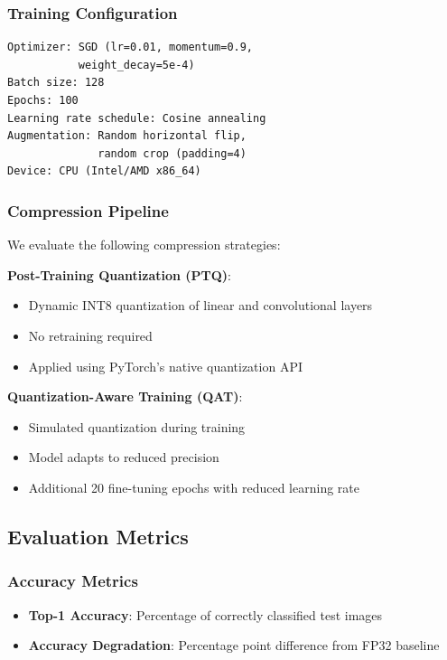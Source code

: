 \subsubsection{Training Configuration}
\begin{verbatim}
Optimizer: SGD (lr=0.01, momentum=0.9,
           weight_decay=5e-4)
Batch size: 128
Epochs: 100
Learning rate schedule: Cosine annealing
Augmentation: Random horizontal flip,
              random crop (padding=4)
Device: CPU (Intel/AMD x86_64)
\end{verbatim}

\subsubsection{Compression Pipeline}

We evaluate the following compression strategies:

\textbf{Post-Training Quantization (PTQ)}:
\begin{itemize}
\item Dynamic INT8 quantization of linear and convolutional layers
\item No retraining required
\item Applied using PyTorch's native quantization API
\end{itemize}

\textbf{Quantization-Aware Training (QAT)}:
\begin{itemize}
\item Simulated quantization during training
\item Model adapts to reduced precision
\item Additional 20 fine-tuning epochs with reduced learning rate
\end{itemize}

\subsection{Evaluation Metrics}

\subsubsection{Accuracy Metrics}
\begin{itemize}
\item \textbf{Top-1 Accuracy}: Percentage of correctly classified test images
\item \textbf{Accuracy Degradation}: Percentage point difference from FP32 baseline
\end{itemize}

